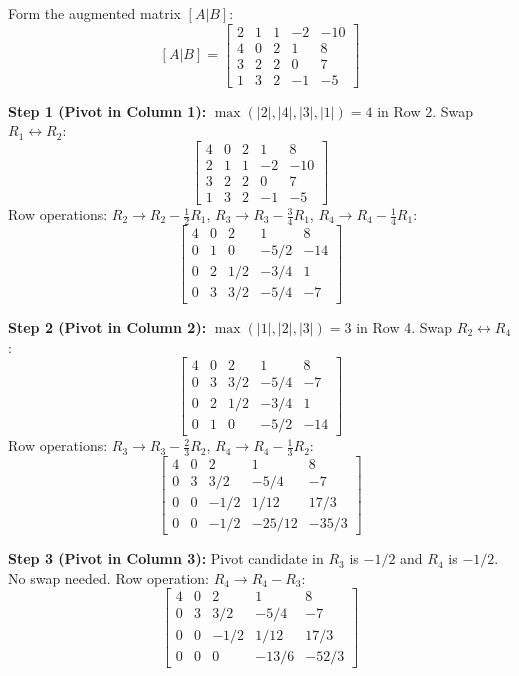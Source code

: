 \documentclass[11pt,a4paper]{article}
\begin{document}
\begin{solbox}
Form the augmented matrix $[A|B]$:
$$[A|B] = \left[\begin{array}{cccc|c}
2 & 1 & 1 & -2 & -10 \\
4 & 0 & 2 & 1 & 8 \\
3 & 2 & 2 & 0 & 7 \\
1 & 3 & 2 & -1 & -5
\end{array}\right]$$

\textbf{Step 1 (Pivot in Column 1):} $\max(|2|, |4|, |3|, |1|) = 4$ in Row 2. Swap $R_1 \leftrightarrow R_2$:
$$\left[\begin{array}{cccc|c}
4 & 0 & 2 & 1 & 8 \\
2 & 1 & 1 & -2 & -10 \\
3 & 2 & 2 & 0 & 7 \\
1 & 3 & 2 & -1 & -5
\end{array}\right]$$
Row operations: $R_2 \to R_2 - \frac{1}{2} R_1$, $R_3 \to R_3 - \frac{3}{4} R_1$, $R_4 \to R_4 - \frac{1}{4} R_1$:
$$\left[\begin{array}{cccc|c}
4 & 0 & 2 & 1 & 8 \\
0 & 1 & 0 & -5/2 & -14 \\
0 & 2 & 1/2 & -3/4 & 1 \\
0 & 3 & 3/2 & -5/4 & -7
\end{array}\right]$$

\textbf{Step 2 (Pivot in Column 2):} $\max(|1|, |2|, |3|) = 3$ in Row 4. Swap $R_2 \leftrightarrow R_4$:
$$\left[\begin{array}{cccc|c}
4 & 0 & 2 & 1 & 8 \\
0 & 3 & 3/2 & -5/4 & -7 \\
0 & 2 & 1/2 & -3/4 & 1 \\
0 & 1 & 0 & -5/2 & -14
\end{array}\right]$$
Row operations: $R_3 \to R_3 - \frac{2}{3} R_2$, $R_4 \to R_4 - \frac{1}{3} R_2$:
$$\left[\begin{array}{cccc|c}
4 & 0 & 2 & 1 & 8 \\
0 & 3 & 3/2 & -5/4 & -7 \\
0 & 0 & -1/2 & 1/12 & 17/3 \\
0 & 0 & -1/2 & -25/12 & -35/3
\end{array}\right]$$

\textbf{Step 3 (Pivot in Column 3):} Pivot candidate in $R_3$ is $-1/2$ and $R_4$ is $-1/2$. No swap needed.
Row operation: $R_4 \to R_4 - R_3$:
$$\left[\begin{array}{cccc|c}
4 & 0 & 2 & 1 & 8 \\
0 & 3 & 3/2 & -5/4 & -7 \\
0 & 0 & -1/2 & 1/12 & 17/3 \\
0 & 0 & 0 & -13/6 & -52/3
\end{array}\right]$$


\end{solbox}
\end{document}

